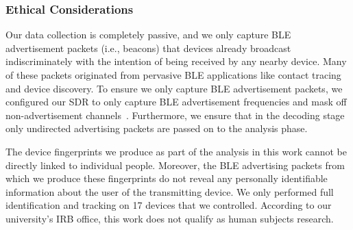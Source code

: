 \subsubsection*{Ethical Considerations}
Our data collection is completely passive, and we only capture BLE advertisement packets
(i.e., beacons) that devices already broadcast indiscriminately with the intention of being
received by any nearby device. Many of these packets originated from pervasive
BLE applications like contact tracing and device discovery. To ensure we only
capture BLE advertisement packets, we configured our SDR to only capture BLE
advertisement frequencies and mask off non-advertisement
channels~\cite{sparsdr}.  Furthermore, we ensure that in the decoding stage
only undirected advertising packets are passed on to the analysis phase.

The device fingerprints we produce as part of the analysis in this work cannot
be directly linked to individual people. Moreover, the BLE advertising packets 
from which we produce these fingerprints do not reveal any personally
identifiable information about the user of the transmitting device.  We only
performed full identification and tracking on 17
devices that we controlled.
According to our university's IRB office, this work does not qualify as
human subjects research.

